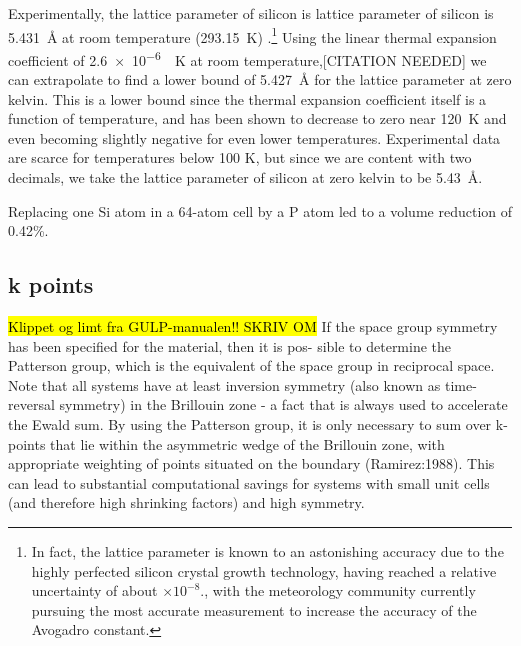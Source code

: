 \documentclass[11pt,bibliography=totoc,index=totoc]{scrbook}   %
\newcommand{\comment}[1]{\hl{#1}}
\begin{document}
Experimentally, the lattice parameter of silicon is lattice parameter of silicon is \SI{5.431}{\angstrom} at room temperature (\SI{293.15}{\kelvin}) .\cite{CODATA:2006}\footnote{In fact, the lattice parameter is known to an astonishing accuracy due to the highly perfected silicon crystal growth technology, having reached a relative uncertainty of about $\times 10^{-8}$.\cite{Becker:2009}, with the meteorology community currently pursuing the most accurate measurement to increase the accuracy of the Avogadro constant.}
Using the linear thermal expansion coefficient of \SI{2.6e-6}{\per\kelvin} at room temperature,[CITATION NEEDED]
we can extrapolate to find a lower bound of \SI{5.427}{\angstrom} for the lattice parameter at zero kelvin. This is a lower bound since the thermal expansion coefficient itself is a function of temperature, and has been shown to decrease to zero near \SI{120}{\kelvin} and even becoming slightly negative for even lower temperatures.\cite{Sugino:1990} Experimental data are scarce for temperatures below 100 K, but since we are content with two decimals, we take the lattice parameter of silicon at zero kelvin to be \SI{5.43}{\angstrom}.

Replacing one Si atom in a 64-atom cell by a P atom led to a volume reduction of 0.42\%.



\subsection{k points}

\begin{framed}
    \comment{Klippet og limt fra GULP-manualen!! SKRIV OM}
    If the space group symmetry has been specified for the material, then it is pos- sible to determine the Patterson group, which is the equivalent of the space group in reciprocal space. Note that all systems have at least inversion symmetry (also known as time-reversal symmetry) in the Brillouin zone - a fact that is always used to accelerate the Ewald sum. By using the Patterson group, it is only necessary to sum over k-points that lie within the asymmetric wedge of the Brillouin zone, with appropriate weighting of points situated on the boundary (Ramirez:1988). This can lead to substantial computational savings for systems with small unit cells (and therefore high shrinking factors) and high symmetry.
\end{framed}
\end{document}
